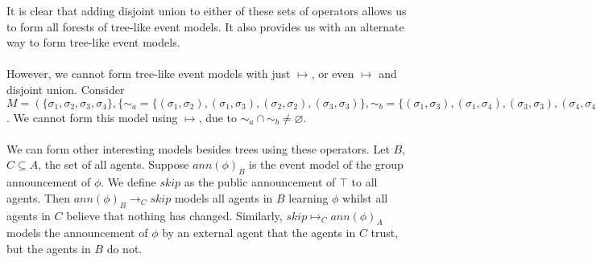 \documentclass[12pt, a4paper, titlepage]{scrartcl}
\begin{document}
It is clear that adding disjoint union to either of these sets of operators
allows us to form all forests of tree-like event models.
It also provides us with an alternate way to form tree-like event models.\\
\\
However, we cannot form tree-like event models with just $\mapsto$, or even
$\mapsto$ and disjoint union.
Consider $M = ( \{\sigma_1, \sigma_2, \sigma_3, \sigma_4\}, \{\sim_a =
\{(\sigma_1,\sigma_2),(\sigma_1,\sigma_3),(\sigma_2,\sigma_2),(\sigma_3,\sigma_3)\},
\sim_b =
\{(\sigma_1,\sigma_3),(\sigma_1,\sigma_4),(\sigma_3,\sigma_3),(\sigma_4,\sigma_4)\}\},
pre)$.
We cannot form this model using $ \mapsto $, due to $\sim_a \cap \sim_b \neq
\varnothing$.\\
\\
We can form other interesting models besides trees using these operators.
Let $B$, $C \subseteq A$, the set of all agents.
Suppose $ann(\phi)_B$ is the event model of the group announcement of $\phi$.
We define $skip$ as the public announcement of $\top$ to all agents.
Then $ann(\phi)_B \to_C skip$ models all agents in $B$ learning $\phi$ whilst all agents in $C$
believe that nothing has changed.
Similarly, $skip \mapsto_C ann(\phi)_A$ models the announcement of $\phi$ by an external agent that
the agents in $C$ trust, but the agents in $B$ do not.
\end{document}
